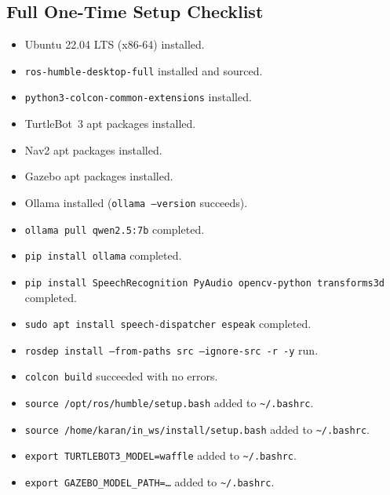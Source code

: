 \documentclass[12pt,a4paper]{report}
\begin{document}
\subsection*{Full One-Time Setup Checklist}

\begin{itemize}[leftmargin=2em, label=$\square$]
  \item Ubuntu 22.04 LTS (x86-64) installed.
  \item \texttt{ros-humble-desktop-full} installed and sourced.
  \item \texttt{python3-colcon-common-extensions} installed.
  \item TurtleBot~3 apt packages installed.
  \item Nav2 apt packages installed.
  \item Gazebo apt packages installed.
  \item Ollama installed (\texttt{ollama --version} succeeds).
  \item \texttt{ollama pull qwen2.5:7b} completed.
  \item \texttt{pip install ollama} completed.
  \item \texttt{pip install SpeechRecognition PyAudio opencv-python transforms3d}
        completed.
  \item \texttt{sudo apt install speech-dispatcher espeak} completed.
  \item \texttt{rosdep install --from-paths src --ignore-src -r -y} run.
  \item \texttt{colcon build} succeeded with no errors.
  \item \texttt{source /opt/ros/humble/setup.bash} added to \texttt{\textasciitilde/.bashrc}.
  \item \texttt{source /home/karan/in\_ws/install/setup.bash} added to
        \texttt{\textasciitilde/.bashrc}.
  \item \texttt{export TURTLEBOT3\_MODEL=waffle} added to
        \texttt{\textasciitilde/.bashrc}.
  \item \texttt{export GAZEBO\_MODEL\_PATH=\ldots} added to
        \texttt{\textasciitilde/.bashrc}.
\end{itemize}

\end{document}
